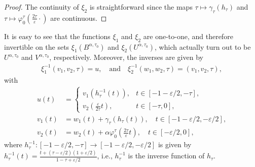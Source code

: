 \documentclass[a4paper,11pt]{article}
\theoremstyle{plain}
\theoremstyle{definition}
\theoremstyle{definition}
\numberwithin{equation}{section}
\begin{document}
\begin{proof}
The continuity of $\xi_2$ is straightforward since the maps $\tau\mapsto \gamma_\tau(h_\tau)$ and $\tau\mapsto \varphi_0^\tau\left( \frac{2\tau}{\varepsilon} \cdot \right)$ are continuous.
\end{proof}

It is easy to see that the functions $\xi_1$ and $\xi_2$ are one-to-one, and therefore invertible on the sets $\xi_1(B^{\alpha,\tau_0})$ and $\xi_2(U^{\alpha,\tau_0})$, which actually turn out to be $U^{\alpha,\tau_0}$ and $V^{\alpha,\tau_0}$, respectively. Moreover, the inverses are given by
\begin{align*}
    \xi_1^{-1}(v_1,v_2,\tau) = u, \quad\text{and}\quad \xi_2^{-1}(w_1,w_2,\tau) = (v_1,v_2,\tau),
\end{align*}
with
\begin{align*}
    u(t)&= \begin{cases}
        v_1(h_\tau^{-1}(t)), & t\in[-1-\varepsilon/2,-\tau], \\
        v_2\left( \frac{\varepsilon}{2\tau} t \right), & t\in[-\tau,0],
    \end{cases}\\
    v_1(t)&= w_1(t) + \gamma_\tau(h_\tau(t)), \quad t\in[-1-\varepsilon/2,-\varepsilon/2], \\
    v_2(t) &= w_2(t) + \alpha\varphi_0^{\tau} \left( \frac{2\tau}{\varepsilon} t \right), \quad t\in[-\varepsilon/2,0],
\end{align*}
where $h_\tau^{-1} \colon [-1-\varepsilon/2, -\tau] \to [-1-\varepsilon/2,-\varepsilon/2]$ is given by $h_\tau^{-1}(t) = \frac{t + (\tau-\varepsilon/2)(1+\varepsilon/2)}{1-\tau + \varepsilon/2}$, i.e., $h_\tau^{-1}$ is the inverse function of $h_\tau$.
\end{document}

